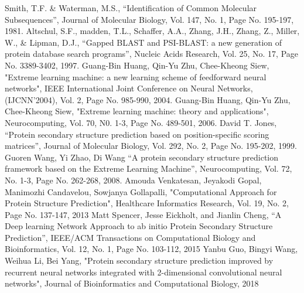 \documentclass[12pt]{article}
\numberwithin{figure}{section}
\begin{document}
\clearpage
{}
\begin{thebibliography}{}
Smith, T.F. \& Waterman, M.S., “Identification of Common Molecular Subsequences”, Journal of Molecular Biology, Vol. 147, No. 1, Page No. 195-197, 1981.
Altschul, S.F., madden, T.L., Schaffer, A.A., Zhang, J.H., Zhang, Z., Miller, W., \& Lipman, D.J., “Gapped BLAST and PSI-BLAST: a new generation of protein database search programs”, Nucleic Acids Research, Vol. 25, No. 17, Page No. 3389-3402, 1997.
 Guang-Bin Huang, Qin-Yu Zhu, Chee-Kheong Siew, "Extreme learning machine: a new learning scheme of feedforward neural networks", IEEE International Joint Conference on Neural Networks, (IJCNN'2004), Vol. 2, Page No. 985-990, 2004.
 Guang-Bin Huang, Qin-Yu Zhu, Chee-Kheong Siew, "Extreme learning machine: theory and applications", Neurocomputing, Vol. 70, N0. 1-3, Page No. 489-501, 2006.
David T. Jones, “Protein secondary structure prediction based on position-specific scoring matrices”, Journal of Molecular Biology, Vol. 292, No. 2, Page No. 195-202, 1999.
Guoren Wang, Yi Zhao, Di Wang “A protein secondary structure prediction framework based on the Extreme Learning Machine”, Neurocomputing, Vol. 72, No. 1-3, Page No. 262-268, 2008.
Amouda Venkatesan, Jeyakodi Gopal, Manimozhi Candavelou, Sowjanya Gollapalli, "Computational Approach for Protein Structure Prediction", Healthcare Informatics Research, Vol. 19, No. 2, Page No. 137-147, 2013
Matt Spencer, Jesse Eickholt, and Jianlin Cheng, “A Deep learning Network Approach to ab initio Protein Secondary Structure Prediction”, IEEE/ACM Transactions on Computational Biology and Bioinformatics, Vol. 12, No. 1, Page No. 103-112, 2015 
Yanbu Guo, Bingyi Wang, Weihua Li, Bei Yang, "Protein secondary structure prediction improved by recurrent neural networks integrated with 2-dimensional convolutional neural networks", Journal of Bioinformatics and Computational Biology, 2018
\end{thebibliography}
\end{document}

